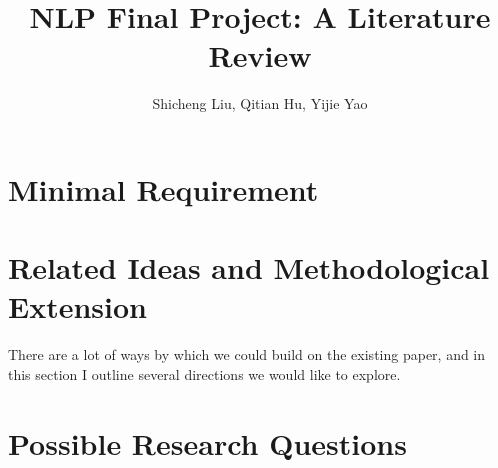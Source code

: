 \documentclass{article}
\title{NLP Final Project: A Literature Review}
\author{Shicheng Liu, Qitian Hu, Yijie Yao}
\begin{document}
\maketitle 

\section{Minimal Requirement}


\section{Related Ideas and Methodological Extension}


There are a lot of ways by which we could build on the existing paper, and in this section I outline several directions we would like to explore.


\section{Possible Research Questions}









\end{document}
